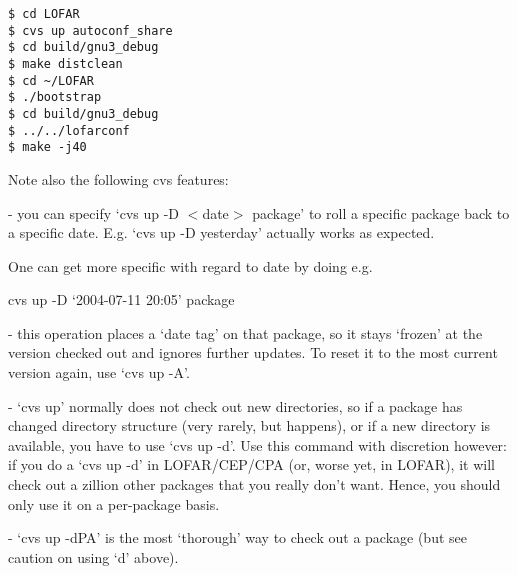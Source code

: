 \documentclass[10pt]{article}
\begin{document}
\begin{verbatim}
$ cd LOFAR
$ cvs up autoconf_share
$ cd build/gnu3_debug
$ make distclean
$ cd ~/LOFAR
$ ./bootstrap
$ cd build/gnu3_debug
$ ../../lofarconf 
$ make -j40
\end{verbatim}


Note also the following cvs features:

- you can specify `cvs up -D $<$date$>$ package' to roll a specific package
back to a specific date. E.g. `cvs up -D yesterday' actually works as
expected.

One can get more specific with regard to date by doing e.g.

 cvs up -D `2004-07-11 20:05' package

- this operation places a `date tag' on that package, so it stays `frozen'
at the version checked out and ignores further updates. To reset it to the
most current version again, use `cvs up -A'.

- `cvs up' normally does not check out new directories, so if a package has
changed directory structure (very rarely, but happens), or if a new
directory is available, you have to use `cvs up -d'. Use this command with
discretion however: if you do a `cvs up -d' in LOFAR/CEP/CPA (or, worse yet,
in LOFAR), it will check out a zillion other packages that you really don't
want. Hence, you should only use it on a per-package basis.

- `cvs up -dPA' is the most `thorough' way to check out a package (but see
caution on using `d' above).
  
\end{document}
